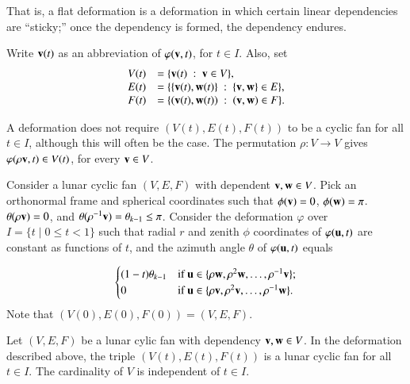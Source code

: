 That is, a flat deformation is a deformation in which certain linear
dependencies are ``sticky;''  once the dependency is formed, the dependency endures.

Write ${\mathbf v}(t)$ as an abbreviation of $\varphi({\mathbf v},t)$, for $t\in I$.  
Also, set
$$
\begin{array}{lll}
V(t)&=\{{\mathbf v}(t) \ :\  {\mathbf v}\in V\},\\
E(t)&=\{\{{\mathbf v}(t),{\mathbf w}(t)\}\ :\  \{{\mathbf v},{\mathbf w}\}\in E\},\\
F(t)&= \{({\mathbf v}(t),{\mathbf w}(t)) \ :\   ({\mathbf v},{\mathbf w})\in F\}.
\end{array}
$$


A deformation does not require $(V(t),E(t),F(t))$ to be a cyclic fan for all $t\in I$, although this will often be the case. The permutation $\rho:V\to V$ gives $\varphi(\rho {\mathbf v},t)\in V(t)$, for every ${\mathbf v}\in V$.  


\begin{example}
Consider a lunar cyclic fan $(V,E,F)$ with dependent ${\mathbf v},{\mathbf w}\in V$.   Pick an orthonormal frame and spherical coordinates such that $\phi({\mathbf v})=0$, $\phi({\mathbf w})=\pi$.  $\theta(\rho {\mathbf v})=0$, and $\theta(\rho^{-1} {\mathbf v})=\theta_{k-1}\le\pi$.  Consider the deformation $\varphi$ over 
$I = \{t \mid 0 \le t < 1\}$
such that radial $r$ and zenith $\phi$ coordinates of $\varphi({\mathbf u},t)$ are constant as functions of $t$,
and the azimuth angle $\theta$ of $\varphi({\mathbf u},t)$ equals

$$
\begin{cases} 
   (1-t) \theta_{k-1} & \text{if } {\mathbf u}\in \{\rho {\mathbf w},\rho^2 {\mathbf w},\ldots, \rho^{-1} {\mathbf v}\};\\
   0 & \text{if } {\mathbf u}\in \{\rho {\mathbf v},\rho^2 {\mathbf v},\ldots,\rho^{-1} {\mathbf w}\}.\\
\end{cases}
$$
Note that $(V(0),E(0),F(0)) = (V,E,F)$.
\end{example}
%
%

\begin{lemma}\label{lemma:lunar-deform} 
Let $(V,E,F)$ be a lunar cylic fan with dependency ${\mathbf v},{\mathbf w}\in V$.  In the deformation described above, the triple $(V(t),E(t),F(t))$ is a lunar cyclic fan for all $t\in I$.  The cardinality of $V$ is independent of $t\in I$.
\end{lemma}

